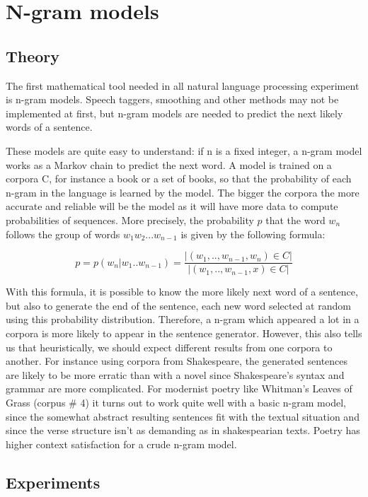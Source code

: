 \documentclass[a4paper,12pt]{article}
\begin{document}
\section{N-gram models}
\label{sec:ngram}

\subsection{Theory}
The first mathematical tool needed in all natural language processing experiment is n-gram models. Speech taggers, smoothing and other methods may not be implemented at first, but n-gram models are needed to predict the next likely words of a sentence.

These models are quite easy to understand: if n is a fixed integer, a n-gram model works as a Markov chain to predict the next word. A model is trained on a corpora C, for instance a book or a set of books, so that the probability of each n-gram in the language is learned by the model. The bigger the corpora the more accurate and reliable will be the model as it will have more data to compute probabilities of sequences. More precisely, the probability $p$ that the word $w_n$ follows the group of words $w_1 w_2 ... w_{n-1}$ is given by the following formula:

$$ p = p(w_n | w_1 .. w_{n-1}) = \frac{|{(w_1, .., w_{n-1}, w_n) \in C}|}{|{(w_1, .., w_{n-1}, x) \in C}|} $$

With this formula, it is possible to know the more likely next word of a sentence, but also to generate the end of the sentence, each new word selected at random using this probability distribution. Therefore, a n-gram which appeared a lot in a corpora is more likely to appear in the sentence generator. However, this also tells us that heuristically, we should expect different results from one corpora to another. For instance using corpora from Shakespeare, the generated sentences are likely to be more erratic than with a novel since Shakespeare's syntax and grammar are more complicated. For modernist poetry like Whitman's Leaves of Grass (corpus \# 4) it turns out to work quite well with a basic n-gram model, since the somewhat abstract resulting sentences fit with the textual situation and since the verse structure isn't as demanding as in shakespearian texts. Poetry has higher context satisfaction for a crude n-gram model.

\subsection{Experiments}
\end{document}
